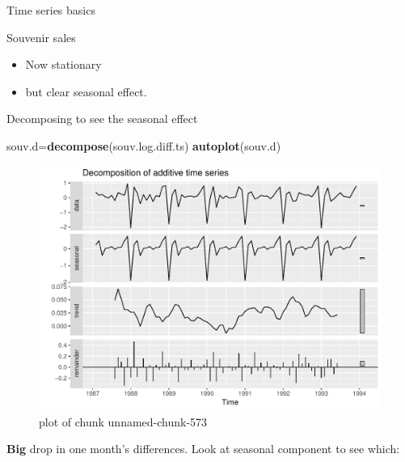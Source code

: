 \documentclass[ignorenonframetext,]{beamer}
\newenvironment{Shaded}{\begin{snugshade}}{\end{snugshade}}
\newcommand{\KeywordTok}[1]{\textcolor[rgb]{0.13,0.29,0.53}{\textbf{#1}}}
\newcommand{\NormalTok}[1]{#1}
\newcommand{\OperatorTok}[1]{\textcolor[rgb]{0.81,0.36,0.00}{\textbf{#1}}}
\providecommand{\tightlist}{%
  \setlength{\itemsep}{0pt}\setlength{\parskip}{0pt}}
\begin{document}
\begin{frame}[fragile]{Time series basics}
\begin{block}{Souvenir sales}
\begin{itemize}
\tightlist
\item
  Now stationary
\item
  but clear seasonal effect.
\end{itemize}

Decomposing to see the seasonal effect

\begin{Shaded}
\begin{Highlighting}[]
\NormalTok{souv.d=}\KeywordTok{decompose}\NormalTok{(souv.log.diff.ts)}
\KeywordTok{autoplot}\NormalTok{(souv.d)}
\end{Highlighting}
\end{Shaded}

\begin{figure}
\centering
\includegraphics{figure/unnamed-chunk-573-1.pdf}
\caption{plot of chunk unnamed-chunk-573}
\end{figure}

\textbf{Big} drop in one month's differences. Look at seasonal component
to see which:

\begin{Shaded}
\end{Shaded}


\end{block}
\end{frame}
\end{document}
